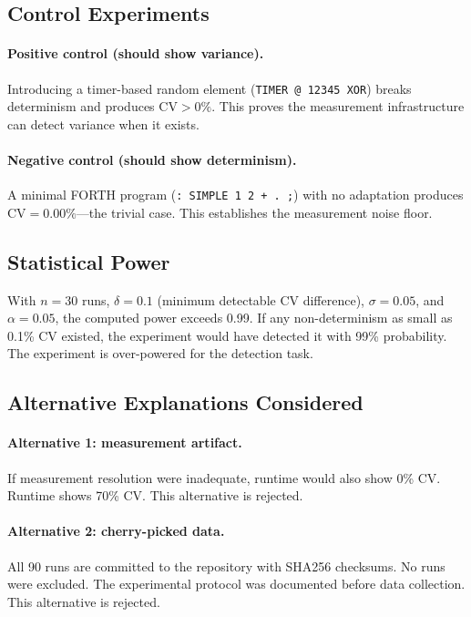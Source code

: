\subsection{Control Experiments}

\paragraph{Positive control (should show variance).}
Introducing a timer-based random element (\texttt{TIMER @ 12345 XOR}) breaks
determinism and produces $\text{CV} > 0\%$. This proves the measurement
infrastructure can detect variance when it exists.

\paragraph{Negative control (should show determinism).}
A minimal FORTH program (\texttt{: SIMPLE 1 2 + . ;}) with no adaptation
produces $\text{CV} = 0.00\%$---the trivial case. This establishes the
measurement noise floor.

\subsection{Statistical Power}

With $n = 30$ runs, $\delta = 0.1$ (minimum detectable CV difference),
$\sigma = 0.05$, and $\alpha = 0.05$, the computed power exceeds 0.99.
If any non-determinism as small as 0.1\% CV existed, the experiment would
have detected it with 99\% probability. The experiment is over-powered for
the detection task.

\subsection{Alternative Explanations Considered}

\paragraph{Alternative 1: measurement artifact.}
If measurement resolution were inadequate, runtime would also show 0\% CV.
Runtime shows 70\% CV. This alternative is rejected.

\paragraph{Alternative 2: cherry-picked data.}
All 90 runs are committed to the repository with SHA256 checksums. No runs
were excluded. The experimental protocol was documented before data
collection. This alternative is rejected.

